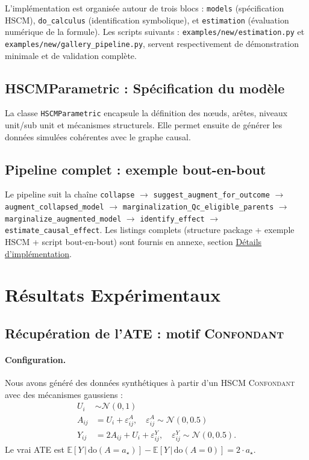 \documentclass[11pt,a4paper]{article}
\newcommand{\E}[1]{\mathbb{E}\left[ #1 \right]}
\newcommand{\rmdo}{\mathrm{do}}
\newcommand{\g}{\,\vert\,}
\begin{document}
L'implémentation est organisée autour de trois blocs : \texttt{models} (spécification HSCM), \texttt{do\_calculus} (identification symbolique), et \texttt{estimation} (évaluation numérique de la formule). Les scripts suivants : \texttt{examples/new/estimation.py} et \texttt{examples/new/gallery\_pipeline.py}, servent respectivement de démonstration minimale et de validation complète.

\subsection{HSCMParametric : Spécification du modèle}

La classe \texttt{HSCMParametric} encapsule la définition des nœuds, arêtes, niveaux unit/sub unit et mécanismes structurels. Elle permet ensuite de générer les données simulées cohérentes avec le graphe causal.

\subsection{Pipeline complet : exemple bout-en-bout}

Le pipeline suit la chaîne \texttt{collapse} $\rightarrow$ \texttt{suggest\_augment\_for\_outcome} $\rightarrow$ \texttt{augment\_collapsed\_model} $\rightarrow$ \texttt{marginalization\_Qc\_eligible\_parents} $\rightarrow$ \texttt{marginalize\_augmented\_model} $\rightarrow$ \texttt{identify\_effect} $\rightarrow$ \texttt{estimate\_causal\_effect}. Les listings complets (structure package + exemple HSCM + script bout-en-bout) sont fournis en annexe, section \hyperref[app:implementation_details]{Détails d'implémentation}.

\section{Résultats Expérimentaux}
\label{sec:experiments}

\subsection{Récupération de l'ATE : motif \textsc{Confondant}}

\paragraph{Configuration.}
Nous avons généré des données synthétiques à partir d'un HSCM \textsc{Confondant} avec des mécanismes gaussiens :
\begin{align*}
  U_i &\sim \mathcal{N}(0, 1) \\
  A_{ij} &= U_i + \varepsilon^A_{ij}, \quad \varepsilon^A_{ij} \sim \mathcal{N}(0, 0.5) \\
  Y_{ij} &= 2 A_{ij} + U_i + \varepsilon^Y_{ij}, \quad \varepsilon^Y_{ij} \sim \mathcal{N}(0, 0.5).
\end{align*}
Le vrai ATE est $\E{Y \g \rmdo(A=a_\star)} - \E{Y \g \rmdo(A=0)} = 2 \cdot a_\star$.
\end{document}
